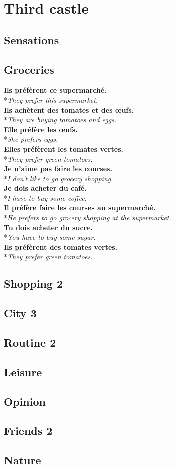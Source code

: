 \documentclass[a4paper,11pt,oneside]{book}
\newcommand{\phrase}[2]{\noindent\textbf{#1}\\*\-\hspace{0.5cm}\textit{#2}\\}
\begin{document}
\chapter{Third castle}

\section{Sensations}
\section{Groceries}

\phrase{Ils préfèrent ce supermarché.}{They prefer this supermarket.}
\phrase{Ils achètent des tomates et des œufs.}{They are buying tomatoes and eggs.}
\phrase{Elle préfère les œufs.}{She prefers eggs.}
\phrase{Elles préfèrent les tomates vertes.}{They prefer green tomatoes.}
\phrase{Je n'aime pas faire les courses.}{I don't like to go grocery shopping.}
\phrase{Je dois acheter du café.}{I have to buy some coffee.}
\phrase{Il préfère faire les courses au supermarché.}{He prefers to go grocery shopping at the supermarket.}
\phrase{Tu dois acheter du sucre.}{You have to buy some sugar.}
\phrase{Ils préfèrent des tomates vertes.}{They prefer green tomatoes.}




\section{Shopping 2}
\section{City 3}
\section{Routine 2}
\section{Leisure}
\section{Opinion}
\section{Friends 2}
\section{Nature}
\end{document}
